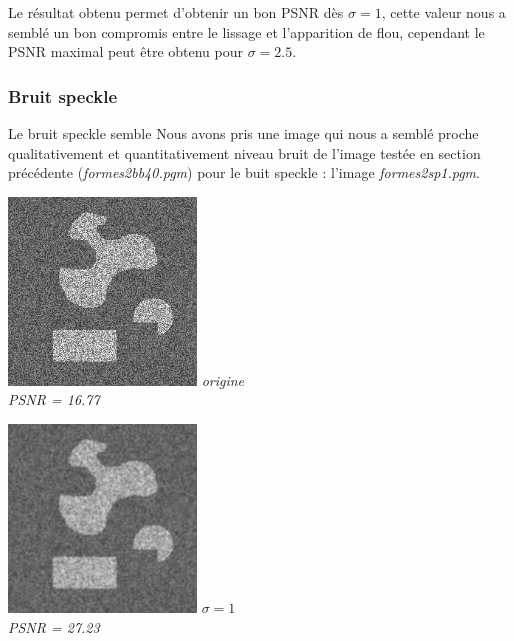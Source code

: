 \documentclass[a4,12pt]{article}
\begin{document}
Le résultat obtenu permet d'obtenir un bon PSNR dès $\sigma=1$, cette valeur nous a semblé un bon compromis entre le lissage et l'apparition de flou, cependant le PSNR maximal peut être obtenu pour $\sigma=2.5$.


\subsubsection*{Bruit speckle}
Le bruit speckle semble
Nous avons pris une image qui nous a semblé proche qualitativement et quantitativement niveau bruit de l'image testée en section précédente (\textit{formes2bb40.pgm}) pour le buit speckle : l'image \textit{formes2sp1.pgm}.
\begin{center}
	\begin{minipage}[c]{0.30\linewidth}
		\begin{center}
			\includegraphics[width = 50mm]{./img/2sp1.jpg}
			\textit{origine}\\
			\textit{PSNR = 16.77}
		\end{center}
	\end{minipage}
	\begin{minipage}[c]{0.30\linewidth}
		\begin{center}
			\includegraphics[width = 50mm]{./img/2sp1-1.jpg}
			\textit{$\sigma = 1$}\\
			\textit{PSNR = 27.23}
		\end{center}
	\end{minipage}
	\begin{minipage}[c]{0.30\linewidth}

\end{minipage}
\end{center}
\end{document}
